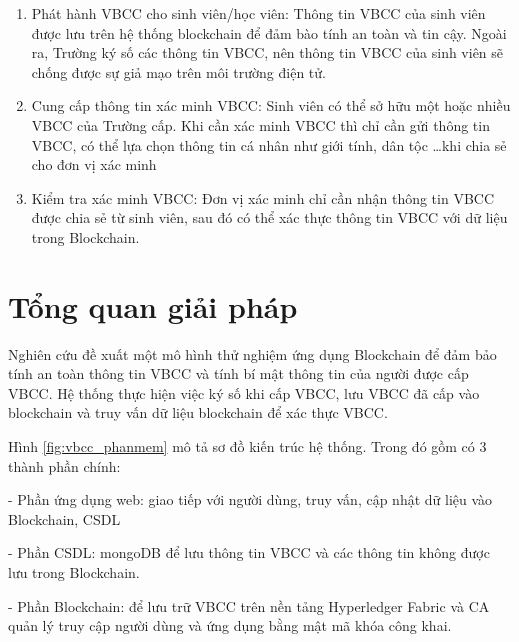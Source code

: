\begin{enumerate}
\item Phát hành VBCC cho sinh viên/học viên:
Thông tin VBCC của sinh viên được lưu trên hệ thống blockchain để đảm bào tính an toàn và tin cậy. Ngoài ra, Trường ký số các thông tin VBCC, nên thông tin VBCC của sinh viên sẽ chống được sự giả mạo trên môi trường điện tử.

\item Cung cấp thông tin xác minh VBCC:
Sinh viên có thể sở hữu một hoặc nhiều VBCC của Trường cấp. Khi cần xác minh VBCC thì chỉ cần gửi thông tin VBCC, có thể lựa chọn thông tin cá nhân như giới tính, dân tộc \ldots khi chia sẻ cho đơn vị xác minh

\item Kiểm tra xác minh VBCC:
Đơn vị xác minh chỉ cần nhận thông tin VBCC được chia sẻ từ sinh viên, sau đó có thể xác thực thông tin VBCC với dữ liệu trong Blockchain.

\end{enumerate}


\section{Tổng quan giải pháp}

Nghiên cứu đề xuất một mô hình thử nghiệm ứng dụng Blockchain để đảm bảo tính an toàn thông tin VBCC và tính bí mật thông tin của người được cấp VBCC.
Hệ thống thực hiện việc ký số khi cấp VBCC, lưu VBCC đã cấp vào blockchain và truy vấn dữ liệu blockchain để xác thực VBCC. 

Hình \ref{fig:vbcc_phanmem} mô tả sơ đồ kiến trúc hệ thống. Trong đó gồm có 3 thành phần chính:

- Phần ứng dụng web: giao tiếp với người dùng, truy vấn, cập nhật dữ liệu vào Blockchain, CSDL

- Phần CSDL: mongoDB để lưu thông tin VBCC và các thông tin không được lưu trong Blockchain.

- Phần Blockchain: để lưu trữ VBCC trên nền tảng Hyperledger Fabric và CA quản lý truy cập người dùng và ứng dụng bằng mật mã khóa công khai.


